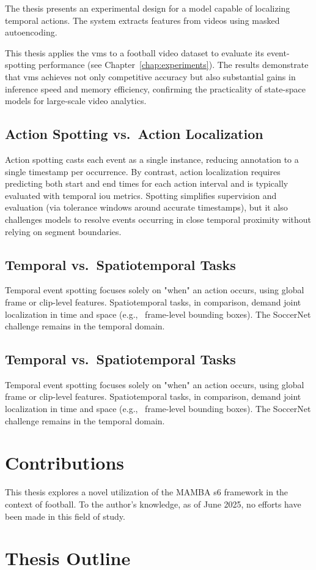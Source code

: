 The thesis presents an experimental design for a model capable of localizing temporal actions. The system extracts features from videos using masked autoencoding.

This thesis applies the \acrfull{vms} to a football video dataset to evaluate its event-spotting performance (see Chapter~\ref{chap:experiments}). The results demonstrate that \acrshort{vms} achieves not only competitive accuracy but also substantial gains in inference speed and memory efficiency, confirming the practicality of state-space models for large-scale video analytics. 

\subsection{Action Spotting vs.\ Action Localization}
Action spotting casts each event as a single instance, reducing annotation to a single timestamp per occurrence. By contrast, action localization requires predicting both start and end times for each action interval and is typically evaluated with temporal \acrfull{iou} metrics. Spotting simplifies supervision and evaluation (via tolerance windows around accurate timestamps), but it also challenges models to resolve events occurring in close temporal proximity without relying on segment boundaries.

\subsection{Temporal vs.\ Spatiotemporal Tasks}
Temporal event spotting focuses solely on "when" an action occurs, using global frame or clip-level features. Spatiotemporal tasks, in comparison, demand joint localization in time and space (e.g., \ frame-level bounding boxes). The SoccerNet challenge remains in the temporal domain.


\subsection{Temporal vs.\ Spatiotemporal Tasks}
Temporal event spotting focuses solely on "when" an action occurs, using global frame or clip-level features. Spatiotemporal tasks, in comparison, demand joint localization in time and space (e.g., \ frame-level bounding boxes). The SoccerNet challenge remains in the temporal domain.



\section{Contributions}

This thesis explores a novel utilization of the MAMBA \acrshort{s6} framework in the context of football. To the author's knowledge, as of June 2025, no efforts have been made in this field of study. 

\section{Thesis Outline}

